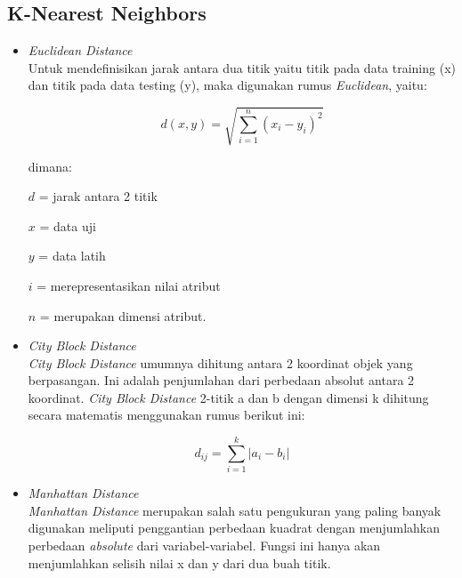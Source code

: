 \documentclass[conference]{IEEEtran}
\begin{document}
\subsection{K-Nearest Neighbors}
\begin{itemize}
Algoritme k tetangga terdekat adalah sebuah metode untuk melakukan klasifikasi terhadap objek berdasarkan data pemelajaran yang jaraknya paling dekat dengan objek tersebut. Data pemelajaran digambarkan ke ruang berdimensi banyak dengan tiap-tiap dimensi mewakili tiap ciri/fitur dari data.
 \item \emph{Euclidean Distance}\\
Untuk mendefinisikan jarak antara dua titik yaitu titik pada data training (x) dan titik pada data testing (y), maka digunakan rumus \emph{Euclidean}\cite{nurhadi2017aplikasi}, yaitu:

\begin{equation*}
d(x,y)=\sqrt{\sum^{n}_{i=1} (x_i-y_i)^2}
\label{eq1}
\end{equation*}

dimana:

$d$ = jarak antara 2 titik

$x$ = data uji

$y$ = data latih

$i$ = merepresentasikan nilai atribut

$n$ = merupakan dimensi atribut.\vspace{10pt}

\item \emph{City Block Distance}\\
\emph{City Block Distance} umumnya dihitung antara 2 koordinat objek yang berpasangan. Ini adalah penjumlahan dari perbedaan absolut antara 2 koordinat. \emph{City Block Distance} 2-titik a dan b dengan dimensi k dihitung secara matematis menggunakan rumus berikut ini:

\begin{equation*}
d_{ij}=\sum^{k}_{i=1} | a_i-b_i |
\label{eq2}
\end{equation*}

\item \emph{Manhattan Distance}\\
\emph{Manhattan Distance} merupakan salah satu pengukuran yang paling banyak digunakan meliputi penggantian perbedaan kuadrat dengan menjumlahkan perbedaan \emph{absolute} dari variabel-variabel. Fungsi ini hanya akan menjumlahkan selisih nilai x dan y dari dua buah titik.
\vspace{10pt}


\end{itemize}
\end{document}
